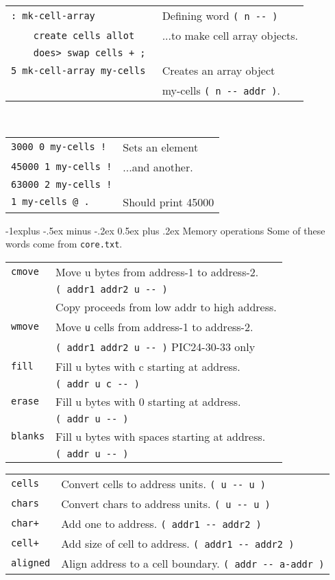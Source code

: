 \documentclass[10pt,landscape,a4paper]{article}
\makeatletter
\renewcommand{\subsection}{\@startsection{subsection}{2}{0mm}%
                                {-1explus -.5ex minus -.2ex}%
                                {0.5ex plus .2ex}%
                                {\normalfont\normalsize\bfseries}}
\makeatother
\begin{document}
\begin{multicols}{3}
\begin{tabular}{@{}ll@{}}
\verb!: mk-cell-array !          & Defining word \verb!( n -- )! \\
\verb!    create cells allot!    & ...to make cell array objects. \\
\verb!    does> swap cells + ; ! &  \\
\verb!5 mk-cell-array my-cells!  & Creates an array object \\
                                 & my-cells \verb!( n -- addr )!. \\
\end{tabular}\\
\begin{tabular}{@{}ll@{}}
\verb?3000 0 my-cells !?         & Sets an element \\
\verb?45000 1 my-cells !?        & ...and another.\\
\verb?63000 2 my-cells !?        & \\
\verb!1 my-cells @ .!            & Should print 45000 \\
\end{tabular}

\medskip

\subsection{Memory operations}
Some of these words come from \verb!core.txt!.
\begin{tabular}{@{}ll@{}}
\verb!cmove!  & Move u bytes from address-1 to address-2. \\
              & \verb!( addr1 addr2 u -- )! \\
              & Copy proceeds from low addr to high address. \\
\verb!wmove!  & Move \verb!u! cells from address-1 to address-2. \\
              & \verb!( addr1 addr2 u -- )! PIC24-30-33 only \\
\verb!fill!   & Fill u bytes with c starting at address. \\
              & \verb!( addr u c -- )! \\
\verb!erase!  & Fill u bytes with 0 starting at address. \\
              & \verb!( addr u -- )! \\
\verb!blanks! & Fill u bytes with spaces starting at address. \\
              & \verb!( addr u -- )! \\
\end{tabular}
\begin{tabular}{@{}ll@{}}
\verb!cells!  & Convert cells to address units. \verb!( u -- u )! \\
\verb!chars!  & Convert chars to address units. \verb!( u -- u )! \\
\verb!char+!  & Add one to address. \verb!( addr1 -- addr2 )! \\
\verb!cell+!  & Add size of cell to address. \verb!( addr1 -- addr2 )! \\
\verb!aligned!  & Align address to a cell boundary. \verb!( addr -- a-addr )! \\
\end{tabular}


\end{multicols}
\end{document}
